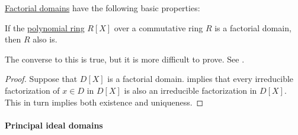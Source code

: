 \begin{proposition}\label{thm:def:factorial_domain}
  \hyperref[def:factorial_domain]{Factorial domains} have the following basic properties:
  \begin{thmenum}
     If the \hyperref[def:polynomial_algebra]{polynomial ring} \( R[X] \) over a commutative ring \( R \) is a factorial domain, then \( R \) also is.

    The converse to this is true, but it is more difficult to prove. See .
  \end{thmenum}
\end{proposition}
\begin{proof}
   Suppose that \( D[X] \) is a factorial domain.  implies that every irreducible factorization of \( x \in D \) in \( D[X] \) is also an irreducible factorization in \( D[X] \). This in turn implies both existence and uniqueness.
\end{proof}

\paragraph{Principal ideal domains}

